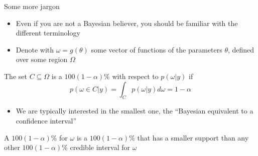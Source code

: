 \renewcommand{\Source}{\textcite{Koop2003}, p. 44}
\begin{frame}{Some more jargon}
\begin{itemize}
    \item Even if you are not a Bayesian believer, you should be familiar with the different terminology
    \item Denote with $\omega=g(\theta)$ some vector of functions of the parameters $\theta$, defined over some region $\Omega$
\end{itemize}
      \begin{Definition}
      The set $C\subseteq \Omega$ is a $100(1-\alpha)\%$  with respect to $p(\omega|y)$ if
      \vspace{-.3cm}
      \begin{equation}
      p(\omega \in C|y)=\int_C p(\omega|y)d\omega=1-\alpha
      \end{equation}
    \end{Definition}
\begin{itemize}
    \item We are typically interested in the smallest one, the ``Bayesian equivalent to a confidence interval''
\end{itemize}
      \begin{Definition}
      A $100(1-\alpha)\%$  for $\omega$ is a $100(1-\alpha)\%$  that has a smaller support than any other $100(1-\alpha)\%$ credible interval for $\omega$
    \end{Definition}
\end{frame}

